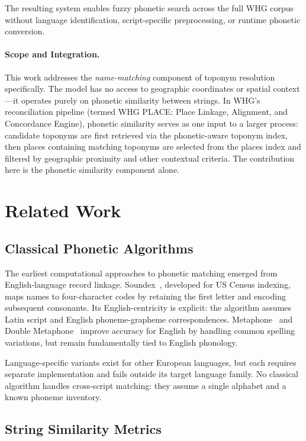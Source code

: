 \documentclass[11pt,a4paper]{article}
\begin{document}
The resulting system enables fuzzy phonetic search across the full WHG corpus without language identification, script-specific preprocessing, or runtime phonetic conversion.

\paragraph{Scope and Integration.} This work addresses the \emph{name-matching} component of toponym resolution specifically. The model has no access to geographic coordinates or spatial context---it operates purely on phonetic similarity between strings. In WHG's reconciliation pipeline (termed WHG PLACE: Place Linkage, Alignment, and Concordance Engine), phonetic similarity serves as one input to a larger process: candidate toponyms are first retrieved via the phonetic-aware toponym index, then places containing matching toponyms are selected from the places index and filtered by geographic proximity and other contextual criteria. The contribution here is the phonetic similarity component alone.


\section{Related Work}
\label{sec:related}

\subsection{Classical Phonetic Algorithms}

The earliest computational approaches to phonetic matching emerged from English-language record linkage. Soundex~\citep{odell1918}, developed for US Census indexing, maps names to four-character codes by retaining the first letter and encoding subsequent consonants. Its English-centricity is explicit: the algorithm assumes Latin script and English phoneme-grapheme correspondences. Metaphone~\citep{philips1990} and Double Metaphone~\citep{philips2000} improve accuracy for English by handling common spelling variations, but remain fundamentally tied to English phonology.

Language-specific variants exist for other European languages, but each requires separate implementation and fails outside its target language family. No classical algorithm handles cross-script matching: they assume a single alphabet and a known phoneme inventory.

\subsection{String Similarity Metrics}
\end{document}
